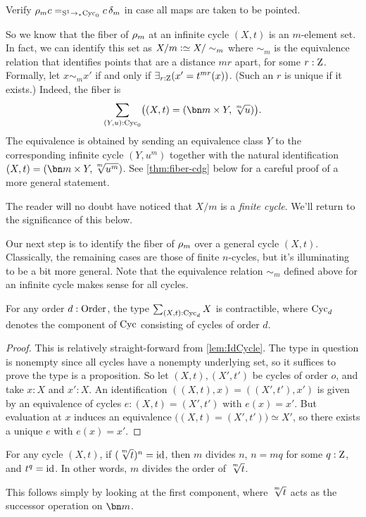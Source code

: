 \begin{xca}\label{xca:pointed-maps-circle}
Verify $\rho_{m}c=_{{\mathrm{S}^1}\to_\ast\mathrm{Cyc}_0}c\,\delta_{m}$ in case all maps are taken to be pointed.
\end{xca}

So we know that the fiber of $\rho_{m}$ at an infinite cycle $(X,t)$
is an $m$-element set. In fact, we can identify this set as
$X/m \defeq X/\sim_m$ where $\sim_m$ is the equivalence relation that
identifies points that are a distance $mr$ apart, for some $r:\mathrm{Z}$.
Formally, let $x\sim_m x'$ if and only if $\exists_{r:\mathrm{Z}}(x'=t^{mr}(x))$.
(Such an $r$ is unique if it exists.)
Indeed, the fiber is
\[
  \sum_{(Y,u):\Cyc_0}\bigl((X,t) = (\bn m\times Y, \sqrt[\uproot{2}m]{u})\bigr).
\]
The equivalence is obtained by sending an equivalence class $Y$ to
the corresponding infinite cycle $(Y,u^m)$ together with the
natural identification $(X,t) = (\bn m\times Y, \sqrt[\uproot{2}m]{u^m})$.
See \cref{thm:fiber-cdg} below for a careful proof of a more general statement.

The reader will no doubt have noticed that $X/m$ is a \emph{finite cycle}.
We'll return to the significance of this below.

Our next step is to identify the fiber of $\rho_{m}$ over a general cycle $(X,t)$.
Classically, the remaining cases are those of finite $n$-cycles,
but it's illuminating to be a bit more general.
Note that the equivalence relation $\sim_m$ defined above for an infinite cycle
makes sense for all cycles.

\begin{lemma}\label{lem:sum-cycle-point-contr}
  For any order $d:\mathrm{Order}$, the type $\sum_{(X,t):\mathrm{Cyc}_d}X$ is contractible,
  where $\mathrm{Cyc}_d$ denotes the component of $\mathrm{Cyc}$ consisting
  of cycles of order $d$.
\end{lemma}
\begin{proof}
  This is relatively straight-forward from \cref{lem:IdCycle}.
  The type in question is nonempty since all cycles have a nonempty underlying set,
  so it suffices to prove the type is a proposition.
  So let $(X,t),(X',t')$ be cycles of order $o$, and take $x:X$ and $x':X$.
  An identification $((X,t),x) = ((X',t'),x')$ is given by an equivalence of
  cycles $e : (X,t)=(X',t')$ with $e(x)=x'$.
  But evaluation at $x$ induces an equivalence
  $\bigl((X,t)=(X',t')\bigr) \simeq X'$,
  so there exists a unique $e$ with $e(x)=x'$.
\end{proof}
\begin{lemma}\label{lem:m-root-id}
  For any cycle $(X,t)$, if $(\sqrt[\uproot{2}m]{t})^n = \id$,
  then $m$ divides $n$, \ie $n=mq$ for some $q:\mathrm{Z}$, and $t^q=\mathord{\mathrm{id}}$.
  In other words, $m$ divides the order of $\sqrt[\uproot{2}m]{t}$.
\end{lemma}
This follows simply by looking at the first component,
where $\sqrt[\uproot{2}m]{t}$ acts as the successor operation on $\bn m$.

